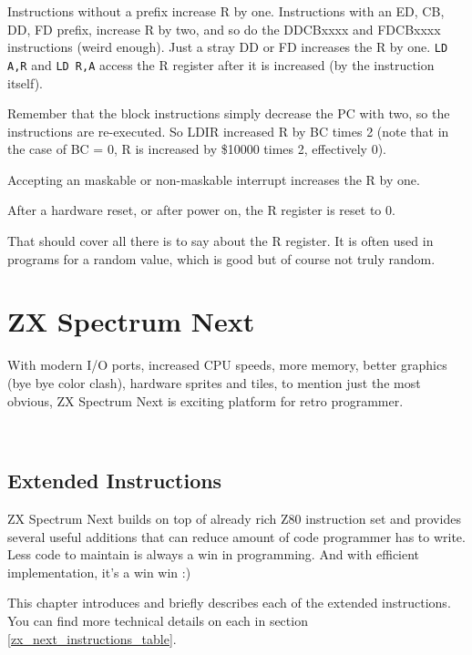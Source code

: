 \documentclass[twoside,openright,a4paper]{book}
\begin{document}
Instructions without a prefix increase R by one. Instructions with an ED, CB, DD, FD prefix, increase R by two, and so do the DDCBxxxx and FDCBxxxx instructions (weird enough). Just a stray DD or FD increases the R by one. {\tt LD A,R} and {\tt LD R,A} access the R register after it is increased (by the instruction itself). 

Remember that the block instructions simply decrease the PC with two, so the instructions are re-executed. So LDIR increased R by BC times 2 (note that in the case of BC = 0, R is increased by \$10000 times 2, effectively 0).

Accepting an maskable or non-maskable interrupt increases the R by one.

After a hardware reset, or after power on, the R register is reset to 0.

That should cover all there is to say about the R register. It is often used in programs for a random value, which is good but of course not truly random.




\chapter{ZX Spectrum Next}

With modern I/O ports, increased CPU speeds, more memory, better graphics (bye bye color clash), hardware sprites and tiles, to mention just the most obvious, ZX Spectrum Next is exciting platform for retro programmer.

~ %

\minitoc

\pagebreak
\section{Extended Instructions}

ZX Spectrum Next builds on top of already rich Z80 instruction set and provides several useful additions that can reduce amount of code programmer has to write. Less code to maintain is always a win in programming. And with efficient implementation, it's a win win :)

This chapter introduces and briefly describes each of the extended instructions. You can find more technical details on each in section \ref{zx_next_instructions_table}.

\newcommand\instritem[1]{\item[{\tt #1}]}
\end{document}
